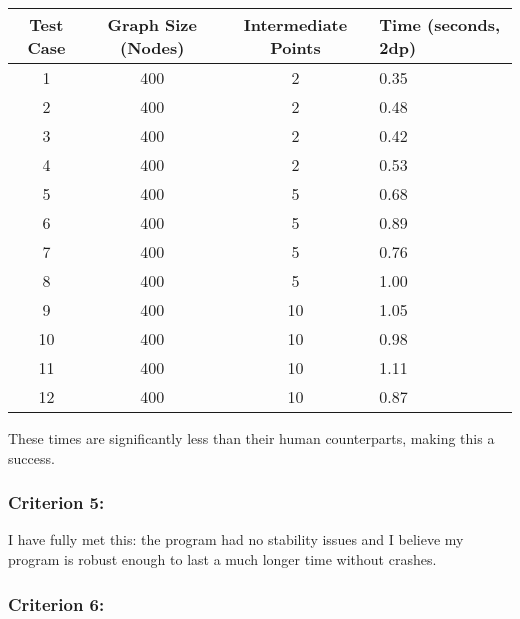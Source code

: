 \begin{table}[h!]
	\centering
	\begin{tabularx}{\textwidth}{|c|c|c|X|}
		\hline
		Test Case & Graph Size (Nodes) & Intermediate Points & Time (seconds, 2dp) \\
		\hline
		1         & 400                & 2                   & 0.35              \\
		\hline
		2         & 400                & 2                   & 0.48              \\
		\hline
		3         & 400                & 2                   & 0.42              \\
		\hline
		4         & 400                & 2                   & 0.53              \\
		\hline
		5         & 400                & 5                   & 0.68              \\
		\hline
		6         & 400                & 5                   & 0.89              \\
		\hline
		7         & 400                & 5                   & 0.76              \\
		\hline
		8         & 400                & 5                   & 1.00              \\
		\hline
		9         & 400                & 10                  & 1.05              \\
		\hline
		10        & 400                & 10                  & 0.98              \\
		\hline
		11        & 400                & 10                  & 1.11              \\
		\hline
		12        & 400                & 10                  & 0.87              \\
		\hline
	\end{tabularx}
\end{table}

These times are significantly less than their human counterparts, making this a success.

\subsubsection{Criterion 5:}

I have fully met this: the program had no stability issues and I believe my program is robust enough to last a much longer time without crashes.

\subsubsection{Criterion 6:}

